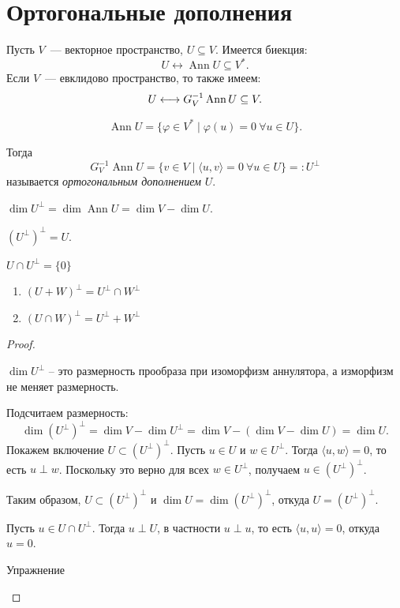 \section{Ортогональные дополнения}
\begin{definition}
    Пусть $V$~--- векторное пространство, $U\subseteq V$. Имеется биекция:
    \[
        U \longleftrightarrow \operatorname{Ann} U \subseteq V^*.
    \]
    Если $V$~--- евклидово пространство, то также имеем:
    \[
        U \longleftrightarrow G_V^{-1}\operatorname{Ann} U \subseteq V.\\
    \]

    \[
    \operatorname{Ann} U = \{\varphi \in V^* \mid \varphi(u) = 0 \ \forall u \in U\}.
    \]

    Тогда
    \[
        G_V^{-1}\operatorname{Ann} U
        = \{v \in V \mid \langle u, v\rangle = 0 \ \forall u \in U\}
        =: U^\perp
    \]
    называется \emph{ортогональным дополнением} $U$.
\end{definition}

\begin{proplist}
    \item $\dim U^\perp = \dim \operatorname{Ann} U = \dim V - \dim U$.
    \item $(U^\perp)^\perp = U$.    
    \item $U \cap U^\perp = \{0\}$
    \item
    \begin{enumerate}
        \item $(U + W)^\perp = U^\perp \cap W^\perp$
        \item $(U \cap W)^\perp = U^\perp + W^\perp$
    \end{enumerate}
    \begin{proof}
    \begin{proofsteps}
        \item
        $\dim U^\perp$ -- это размерность прообраза при изоморфизм аннулятора, а изморфизм не меняет размерность.
        \item
        Подсчитаем размерность:
		\[
			\dim(U^\perp)^\perp
			= \dim V - \dim U^\perp
			= \dim V - (\dim V - \dim U)
			= \dim U.
		\]
		Покажем включение $U \subset (U^\perp)^\perp$. Пусть $u \in U$ и $w \in U^\perp$. Тогда $\langle u, w\rangle = 0$,
  то есть $u \perp w$. Поскольку это верно для всех $w \in U^\perp$, получаем $u \in (U^\perp)^\perp$.

		Таким образом, $U \subset (U^\perp)^\perp$ и $\dim U = \dim(U^\perp)^\perp$, откуда $U = (U^\perp)^\perp$.
        \item
        Пусть $u \in U \cap U^\perp$. Тогда $u \perp U$, в частности $u \perp u$, то есть $\langle u, u\rangle = 0$,
        откуда $u = 0$.
        \item Упражнение

    \end{proofsteps}
    \end{proof}

\end{proplist}



